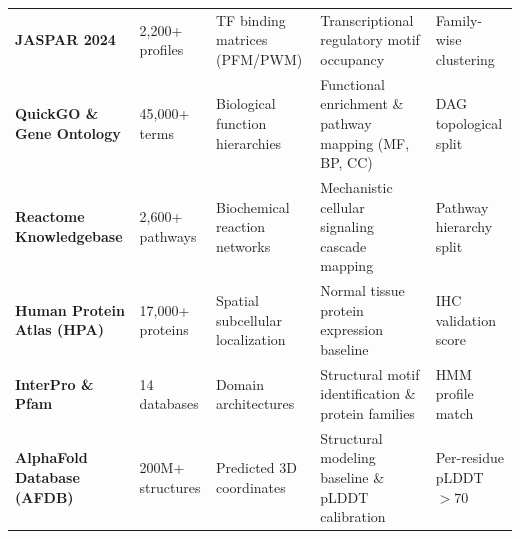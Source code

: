\begin{table}[h!]
\begin{tabular}{lp{3.2cm}p{3.0cm}p{4.1cm}l}
\textbf{JASPAR 2024} & 2,200+ profiles & TF binding matrices (PFM/PWM) & Transcriptional regulatory motif occupancy & Family-wise clustering \\
\textbf{QuickGO \& Gene Ontology} & 45,000+ terms & Biological function hierarchies & Functional enrichment \& pathway mapping (MF, BP, CC) & DAG topological split \\
\textbf{Reactome Knowledgebase} & 2,600+ pathways & Biochemical reaction networks & Mechanistic cellular signaling cascade mapping & Pathway hierarchy split \\
\textbf{Human Protein Atlas (HPA)} & 17,000+ proteins & Spatial subcellular localization & Normal tissue protein expression baseline & IHC validation score \\
\textbf{InterPro \& Pfam} & 14 databases & Domain architectures & Structural motif identification \& protein families & HMM profile match \\
\textbf{AlphaFold Database (AFDB)} & 200M+ structures & Predicted 3D coordinates & Structural modeling baseline \& pLDDT calibration & Per-residue pLDDT $>70$ \\
\bottomrule
\end{tabular}
\end{table}

\vspace{1em}

